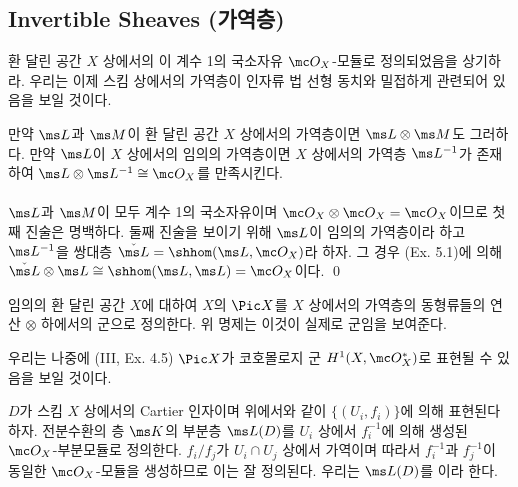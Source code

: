 	
	\subsection*{Invertible Sheaves (가역층)}
	환 달린 공간 $X$ 상에서의 이 계수 1의 국소자유 $\mc O_X$-모듈로 정의되었음을 상기하라.
	우리는 이제 스킴 상에서의 가역층이 인자류 법 선형 동치와 밀접하게 관련되어 있음을 보일 것이다.
	
	
	\begin{proposition}
	만약 $\ms L$과 $\ms M$이 환 달린 공간 $X$ 상에서의 가역층이면 $\ms L\otimes\ms M$도 그러하다.
	만약 $\ms L$이 $X$ 상에서의 임의의 가역층이면 $X$ 상에서의 가역층 $\ms L^{-1}$가 존재하여
	$\ms L\otimes\ms L^{-1}\cong\mc O_X$를 만족시킨다.\\\\
	\pf $\ms L$과 $\ms M$이 모두 계수 1의 국소자유이며 $\mc O_X\otimes\mc O_X=\mc O_X$이므로 첫째 진술은 명백하다.
	둘째 진술을 보이기 위해 $\ms L$이 임의의 가역층이라 하고 $\ms L^{-1}$을 쌍대층 $\check{\ms L}=\shhom(\ms L,\mc O_X)$라 하자.
	그 경우 (Ex. 5.1)에 의해 $\check{\ms L}\otimes\ms L\cong\shhom(\ms L,\ms L)=\mc O_X$이다.
	\qed
	\end{proposition}
	
	
	\begin{definition}
	임의의 환 달린 공간 $X$에 대하여 $X$의  $\Pic X$를 $X$ 상에서의 가역층의 동형류들의
	연산 $\otimes$ 하에서의 군으로 정의한다. 위 명제는 이것이 실제로 군임을 보여준다.
	\end{definition}
	
	
	\begin{remark}
	우리는 나중에 (III, Ex. 4.5) $\Pic X$가 코호몰로지 군 $H^1(X,\mc O_X^*)$로 표현될 수 있음을 보일 것이다.
	\end{remark}
	
	
	\begin{definition}
	$D$가 스킴 $X$ 상에서의 Cartier 인자이며 위에서와 같이 $\{(U_i,f_i)\}$에 의해 표현된다 하자.
	전분수환의 층 $\ms K$의 부분층 $\ms L(D)$를 $U_i$ 상에서 $f_i^{-1}$에 의해 생성된 $\mc O_X$-부분모듈로 정의한다.
	$f_i/f_j$가 $U_i\cap U_j$ 상에서 가역이며 따라서 $f_i^{-1}$과 $f_j^{-1}$이 동일한 $\mc O_X$-모듈을 생성하므로 이는 잘 정의된다.
	우리는 $\ms L(D)$를 이라 한다.
	\end{definition}
	
